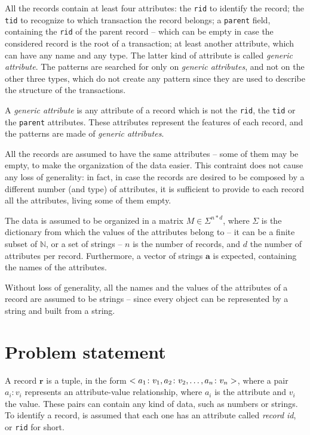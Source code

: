 \documentclass{acm_proc_article-sp-sigmod09}
\begin{document}
All the records contain at least four attributes: the \texttt{rid} to identify the record; the \texttt{tid} to recognize to which transaction the record belongs; a \texttt{parent} field, containing the \texttt{rid} of the parent record -- which can be empty in case the considered record is the root of a transaction; at least another attribute, which can have any name and any type. The latter kind of attribute is called \emph{generic attribute}. The patterns are searched for only on \emph{generic attributes}, and not on the other three types, which do not create any pattern since they are used to describe the structure of the transactions.

\begin{definition}
A \emph{generic attribute} is any attribute of a record which is not the \texttt{rid}, the \texttt{tid} or the \texttt{parent} attributes. These attributes represent the features of each record, and the patterns are made of \emph{generic attributes}.
\end{definition}

All the records are assumed to have the same attributes -- some of them may be empty, to make the organization of the data easier. This contraint does not cause any loss of generality: in fact, in case the records are desired to be composed by a different number (and type) of attributes, it is sufficient to provide to each record all the attributes, living some of them empty.

The data is assumed to be organized in a matrix $M \in \Sigma^{n * d}$, where $\Sigma$ is the dictionary from which the values of the attributes belong to -- it can be a finite subset of $\mathbb{N}$, or a set of strings -- $n$ is the number of records, and $d$ the number of attributes per record. Furthermore, a vector of strings $\boldsymbol{a}$ is expected, containing the names of the attributes.

Without loss of generality, all the names and the values of the attributes of a record are assumed to be strings -- since every object can be represented by a string and built from a string.

\section{Problem statement}
A record $\boldsymbol{r}$ is a tuple, in the form $<a_1 \colon v_1, a_2 \colon v_2, \text{\dots}, a_n \colon v_n>$, where a pair $a_i \colon v_i$ represents an attribute-value relationship, where $a_i$ is the attribute and $v_i$ the value. These pairs can contain any kind of data, such as numbers or strings. To identify a record, is assumed that each one has an attribute called \emph{record id}, or \texttt{rid} for short.
\end{document}
